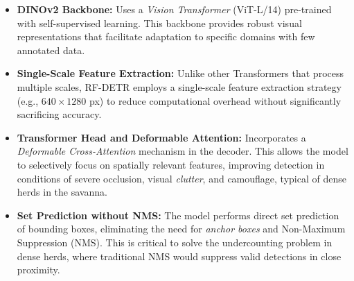 \begin{itemize}
    \item \textbf{DINOv2 Backbone:} Uses a \textit{Vision Transformer} (ViT-L/14) pre-trained with self-supervised learning. This backbone provides robust visual representations that facilitate adaptation to specific domains with few annotated data.
    \item \textbf{Single-Scale Feature Extraction:} Unlike other Transformers that process multiple scales, RF-DETR employs a single-scale feature extraction strategy (e.g., $640 \times 1280$ px) to reduce computational overhead without significantly sacrificing accuracy.
    \item \textbf{Transformer Head and Deformable Attention:} Incorporates a \textit{Deformable Cross-Attention} mechanism in the decoder. This allows the model to selectively focus on spatially relevant features, improving detection in conditions of severe occlusion, visual \textit{clutter}, and camouflage, typical of dense herds in the savanna.
    \item \textbf{Set Prediction without NMS:} The model performs direct set prediction of bounding boxes, eliminating the need for \textit{anchor boxes} and Non-Maximum Suppression (NMS). This is critical to solve the undercounting problem in dense herds, where traditional NMS would suppress valid detections in close proximity.

\end{itemize}
